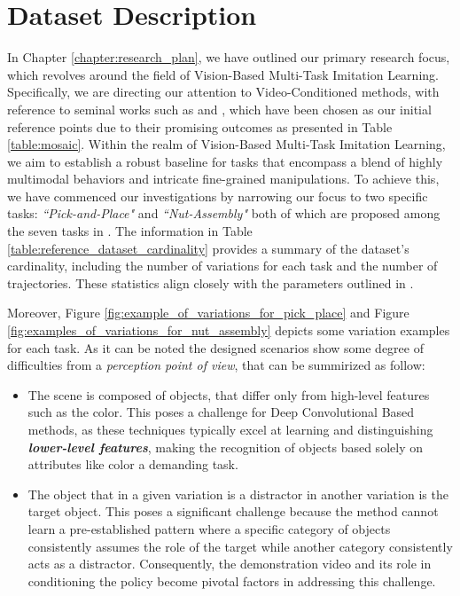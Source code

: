 \section{Dataset Description}
\label{sec:dataset_description}
In Chapter \ref{chapter:research_plan}, we have outlined our primary research focus, which revolves around the field of Vision-Based Multi-Task Imitation Learning. Specifically, we are directing our attention to Video-Conditioned methods, with reference to seminal works such as \cite{mandi2022towards_more_generalizable_one_shot} and \cite{dasari2021transformers_one_shot}, which have been chosen as our initial reference points due to their promising outcomes as presented in Table \ref{table:mosaic}.
Within the realm of Vision-Based Multi-Task Imitation Learning, we aim to establish a robust baseline for tasks that encompass a blend of highly multimodal behaviors and intricate fine-grained manipulations. To achieve this, we have commenced our investigations by narrowing our focus to two specific tasks: \textit{``Pick-and-Place"} and \textit{``Nut-Assembly"} both of which are proposed among the seven tasks in \cite{mandi2022towards_more_generalizable_one_shot}.
The information in Table \ref{table:reference_dataset_cardinality} provides a summary of the dataset's cardinality, including the number of variations for each task and the number of trajectories. These statistics align closely with the parameters outlined in \cite{mandi2022towards_more_generalizable_one_shot}.

Moreover, Figure \ref{fig:example_of_variations_for_pick_place} and Figure \ref{fig:examples_of_variations_for_nut_assembly} depicts some variation examples for each task.
As it can be noted the designed scenarios show some degree of difficulties from a \textit{perception point of view}, that can be summirized as follow:
\begin{itemize}
    \item The scene is composed of objects, that differ only from high-level features such as the color. This poses a challenge for Deep Convolutional Based methods, as these techniques typically excel at learning and distinguishing \textit{\textbf{lower-level features}}, making the recognition of objects based solely on attributes like color a demanding task.
    \item The object that in a given variation is a distractor in another variation is the target object. This poses a significant challenge because the method cannot learn a pre-established pattern where a specific category of objects consistently assumes the role of the target while another category consistently acts as a distractor. Consequently, the demonstration video and its role in conditioning the policy become pivotal factors in addressing this challenge.
\end{itemize}
